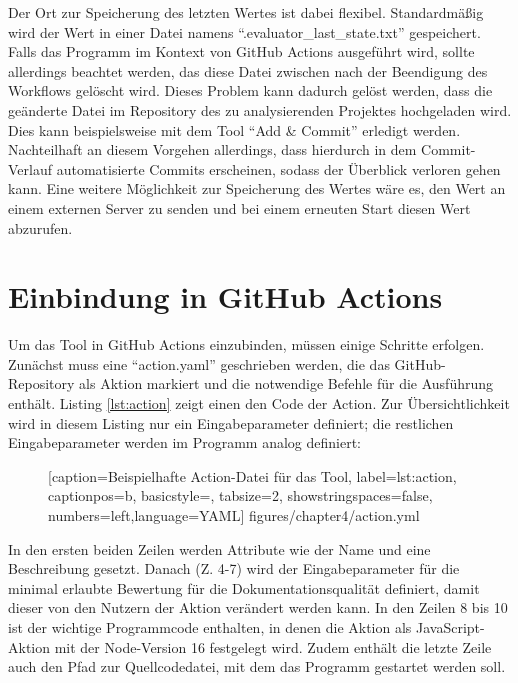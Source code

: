 Der Ort zur Speicherung des letzten Wertes ist dabei flexibel. Standardmäßig wird der Wert in einer Datei namens \enquote{.evaluator\_last\_state.txt} gespeichert. Falls das Programm im Kontext von GitHub Actions ausgeführt wird, sollte allerdings beachtet werden, das diese Datei zwischen nach der Beendigung des Workflows gelöscht wird. Dieses Problem kann dadurch gelöst werden, dass die geänderte Datei im Repository des zu analysierenden Projektes hochgeladen wird. Dies kann beispielsweise mit dem Tool \enquote{Add \& Commit} \cite{add_commit} erledigt werden. Nachteilhaft an diesem Vorgehen allerdings, dass hierdurch in dem Commit-Verlauf automatisierte Commits erscheinen, sodass der Überblick verloren gehen kann.  Eine weitere Möglichkeit zur Speicherung des Wertes wäre es, den Wert an einem externen Server zu senden und bei einem erneuten Start diesen Wert abzurufen. 

  
\section{Einbindung in GitHub Actions}\label{chapter:github_actions_impl}
Um das Tool in GitHub Actions einzubinden, müssen einige Schritte erfolgen. Zunächst muss eine \enquote{action.yaml} geschrieben werden, die das GitHub-Repository als Aktion markiert und die notwendige Befehle für die Ausführung enthält. Listing  \ref{lst:action} zeigt einen den Code der Action. Zur Übersichtlichkeit wird in diesem Listing nur ein Eingabeparameter definiert; die restlichen Eingabeparameter werden im Programm analog definiert:
\begin{figure} [htbp]

[caption={Beispielhafte Action-Datei für das Tool},
label={lst:action},
captionpos=b, basicstyle=\footnotesize, tabsize=2, showstringspaces=false,  numbers=left,language=YAML]
{figures/chapter4/action.yml}
\end{figure}

In den ersten beiden Zeilen werden Attribute wie der Name und eine Beschreibung gesetzt. Danach (Z. 4-7) wird der Eingabeparameter für die minimal erlaubte Bewertung für die Dokumentationsqualität definiert, damit dieser von den Nutzern der Aktion verändert werden kann. In den Zeilen 8 bis 10 ist der wichtige Programmcode enthalten, in denen die Aktion als JavaScript-Aktion mit der Node-Version 16 festgelegt wird. Zudem enthält die letzte Zeile auch den Pfad zur Quellcodedatei, mit dem das Programm gestartet werden soll. 

